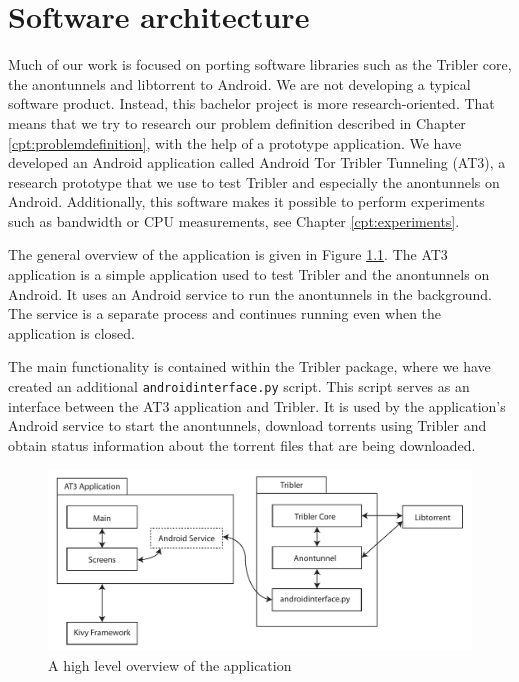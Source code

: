 \chapter{Software architecture}
\label{cpt:softwarearchitecture}
Much of our work is focused on porting software libraries such as the Tribler core, the anontunnels and libtorrent to Android. We are not developing a typical software product. Instead, this bachelor project is more research-oriented. That means that we try to research our problem definition described in Chapter \ref{cpt:problemdefinition}, with the help of a prototype application. We have developed an Android application called Android Tor Tribler Tunneling (AT3), a research prototype that we use to test Tribler and especially the anontunnels on Android. Additionally, this software makes it possible to perform experiments such as bandwidth or CPU measurements, see Chapter \ref{cpt:experiments}.

The general overview of the application is given in Figure \ref{fig:overview}. The AT3 application is a simple application used to test Tribler and the anontunnels on Android. It uses an Android service to run the anontunnels in the background. The service is a separate process and continues running even when the application is closed.

The main functionality is contained within the Tribler package, where we have created an additional \texttt{androidinterface.py} script. This script serves as an interface between the AT3 application and Tribler. It is used by the application's Android service to start the anontunnels, download torrents using Tribler and obtain status information about the torrent files that are being downloaded. 

\begin{figure}[!h]
	\centering
	\includegraphics[width=\textwidth]{graphics/overview.pdf}
	\caption{A high level overview of the application}
	\label{fig:overview}
\end{figure}

